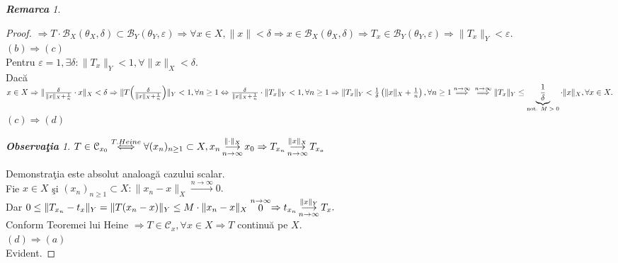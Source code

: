 \documentclass[ a4paper, 12pt]{report}
\theoremstyle{remark}
\newtheorem{remarc}{\bf Remarca}[section]
\newtheorem{obs}{\bf Observa\c tia }[section]
\numberwithin{equation}{section}
\begin{document}
\begin{remarc}
\begin{proof}
$\Rightarrow T \cdot \mathcal{B}_{X}(\theta_{X}, \delta) \subset \mathcal{B}_{Y}(\theta_{Y}, \varepsilon) \Rightarrow \forall x \in X, \lVert x \rVert < \delta \Rightarrow x \in \mathcal{B}_{X}(\theta_{X}, \delta) \Rightarrow T_{x} \in \mathcal{B}_{Y}(\theta_{Y}, \varepsilon) \Rightarrow \lVert T_{x} \rVert_{Y}< \varepsilon.$\\
$(b) \Longrightarrow (c)$\\
Pentru $\varepsilon =1, \exists \delta: \lVert T_x \rVert_{Y}<1, \forall \lVert x \rVert_{X} < \delta.$\\
Dac\u a $x \in X \Rightarrow \lVert \frac{\delta}{\lVert x \rVert_{X}+\frac{1}{n}}\cdot x \rVert_{X} < \delta \Rightarrow \lVert T \Big(  \frac{\delta}{\lVert x \rVert_{X}+\frac{1}{n}} \Big) \rVert_{Y} < 1, \forall n \geq 1 \Leftrightarrow \frac{\delta}{\lVert x \rVert_{X}+\frac{1}{n}} \cdot \lVert T_x \rVert_{Y} < 1, \forall n \geq 1 \Rightarrow \lVert T_x \rVert_{Y} < \frac{1}{\delta} \left( \lVert x \rVert_{X} + \frac{1}{n} \right), \forall n \geq 1 \stackrel{n \rightarrow \infty}{\Longrightarrow}\\
\stackrel{n \rightarrow \infty}{\Longrightarrow} \lVert T_x \rVert_{Y} \leq \underbrace{\frac{1}{\delta}}_\text{not. $M>0$}  \cdot \lVert x \rVert_{X}, \forall x \in X.$\\
$(c) \Longrightarrow (d)$\\
\begin{obs}
$T \in \mathcal{C}_{x_{0}} \stackrel{T. Heine}{\Longleftrightarrow} \forall (x_n)_{n \geq 1} \subset X, x_n \pound\limits_{n \rightarrow \infty}^{\lVert \cdot \rVert_{X}} x_0 \Rightarrow T_{x_{n}} \pound\limits_{n \rightarrow \infty}^{\lVert x \rVert_{X}} T_{x_{o}}$
\end{obs}
Demonstra\c tia este absolut analoag\u a cazului scalar.\\
Fie $x \in X$ \c si $(x_n)_{n \geq 1} \subset X: \lVert x_n - x \rVert_{X} \stackrel{n \rightarrow \infty}{\longrightarrow} 0.$\\
Dar $0 \leq \lVert T_{x_{n}} - t_x \rVert_{Y} = \lVert T(x_n - x) \rVert_{Y} \leq M \cdot \lVert x_n - x \rVert_{X} \stackrel{n \rightarrow \infty}{0} \Rightarrow t_{x_{n}} \pound\limits_{n \rightarrow \infty}^{\lVert x \rVert_{Y}} T_x.$\\
Conform Teoremei lui Heine $\Rightarrow T \in \mathcal{C}_{x}, \forall x \in X \Rightarrow T$ continu\u a pe $X$.\\
$(d)\Longrightarrow (a)$\\
Evident.
\end{proof}
\end{remarc}
\end{document}
